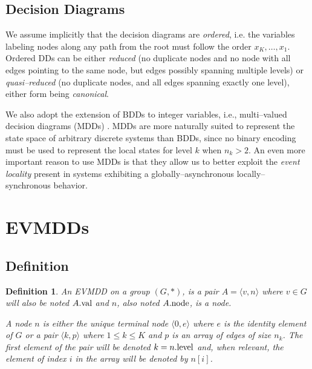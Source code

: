 \documentclass[nocover]             %
{NASA}                       %
\newtheorem{mydefinition}{Definition}[section]
\newcommand{\edge}[2]{\langle #1, #2 \rangle}
\newcommand{\val}[1]{#1{\rm .val}}
\newcommand{\node}[1]{#1{\rm .node}}
\newcommand{\level}[1]{#1{\rm .level}}
\begin{document}
\subsection{Decision Diagrams}

We assume implicitly that the decision diagrams are \emph{ordered},
i.e. the variables labeling nodes along any path from the root must follow
the order $x_K, \ldots, x_1$.
Ordered DDs can be either \emph{reduced} (no duplicate nodes and no node with all
edges pointing to the same node, but edges possibly spanning
multiple levels) or \emph{quasi--reduced} (no duplicate nodes, and all
edges spanning exactly one level), either form being \emph{canonical}.

We also adopt the extension of BDDs to integer variables, i.e., 
multi--valued decision diagrams (MDDs) \cite{Kam1998}. MDDs are more 
naturally suited to represent the state space of arbitrary discrete 
systems than BDDs, since no binary encoding must be used to represent 
the local states for level $k$ when $n_k > 2$. An even more important 
reason to use MDDs is that they allow us to better exploit the 
\emph{event locality} present in systems exhibiting a 
globally--asynchronous locally--synchronous behavior.

\section{EVMDDs}

\subsection{Definition%
  \label{subsection-definition}}

\begin{mydefinition}{\rm  \label{DEF:evmdd}}
An EVMDD on a group $(G, *)$, is a pair $A = \edge{v}{n}$ where $v \in G$ will also 
be noted $\val{A}$ and $n$, also noted $\node{A}$, is a node. 

A \emph{node} $n$ is either the unique terminal node $\langle 0, e \rangle$ where $e$ is the identity element of 
$G$ or a pair $\langle k, p \rangle$ where $1 \leq k \leq K$ and $p$ is an array of edges of size $n_k$. 
The first element of the pair will be denoted $k=\level{n}$ and, when relevant, the element of index $i$ in the array will be denoted by $n[i]$.
\end{mydefinition}
\end{document}
